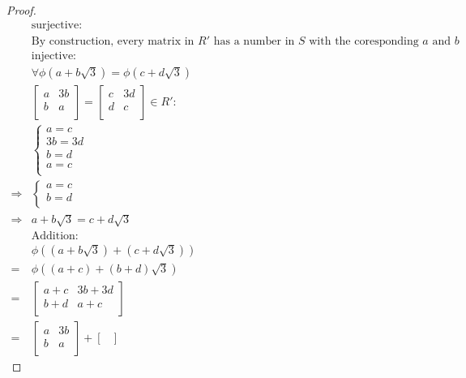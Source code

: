 \documentclass{article}
\begin{document}
\begin{proof}
    \begin{align*}
        &\text{surjective}:\\
        &\text{By construction, every matrix in }R'\text{ has a number in }S\text{ with the coresponding }a\text{ and }b\\
        &\text{injective}:\\
        &\forall \phi(a+b\sqrt{3})=\phi(c+d\sqrt{3})\\
        &\begin{bmatrix}
            a&3b\\
            b&a\\
        \end{bmatrix}=\begin{bmatrix}
            c&3d\\
            d&c\\
        \end{bmatrix}\in R':\\
        &\begin{cases}
            a=c\\
            3b=3d\\
            b=d\\
            a=c\\
        \end{cases}\\
        \Rightarrow&\begin{cases}
            a=c\\
            b=d\\
        \end{cases}\\
        \Rightarrow&a+b\sqrt{3}=c+d\sqrt{3}\\
        &\text{Addition}:\\
        &\phi((a+b\sqrt{3})+(c+d\sqrt{3}))\\
        =&\phi((a+c)+(b+d)\sqrt{3})\\
        =&\begin{bmatrix}
            a+c&3b+3d\\
            b+d&a+c\\
        \end{bmatrix}\\
        =&\begin{bmatrix}
            a&3b\\
            b&a\\
        \end{bmatrix}+\begin{bmatrix}

\end{bmatrix}
\end{align*}
\end{proof}
\end{document}
